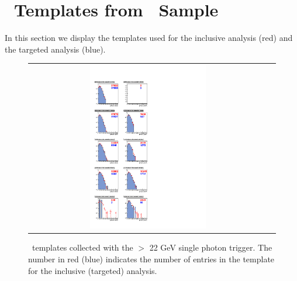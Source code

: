 \clearpage

\section{\MET\ Templates from \gjets\ Sample}
\label{app:templates}

In this section we display the templates used for the inclusive analysis (red) and the targeted analysis (blue).

\begin{figure}[!h]
\begin{center}
\begin{tabular}{cc}
\includegraphics[width=0.5\textwidth]{plots/template_targeted_0_19p5fb.pdf}
\end{tabular}
\caption{
\MET\ templates collected with the \pt $>$ 22 GeV single photon trigger.
The number in red (blue) indicates the number of entries in the template for the inclusive (targeted) analysis.
}
\end{center}
\end{figure}

\clearpage

